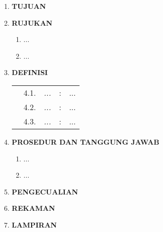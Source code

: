 \documentclass[12pt]{cl.doc}
\begin{document}
    \newpage

    \begin{enumerate}
        \item \textbf{TUJUAN}\\\vspace{1.5ex} 

        \item \textbf{RUJUKAN}
            \begin{enumerate}
                \item ...
                \item ...
            \end{enumerate}

        \item \textbf{DEFINISI}
            \renewcommand{\arraystretch}{2} %
            \begin{longtable}{p{8pt} r p{3cm} c p{10.98cm}}
                & 4.1. & \textit{...} & : & ...\\
                & 4.2. & \textit{...} & : & ...\\
                & 4.3. & \textit{...} & : & ...\\
            \end{longtable}

        \item \textbf{PROSEDUR DAN TANGGUNG JAWAB}
            \begin{enumerate}
                \item ...
                \item ...
            \end{enumerate}

        \item \textbf{PENGECUALIAN}
        \item \textbf{REKAMAN}
        \item \textbf{LAMPIRAN}
    \end{enumerate}
\end{document}
